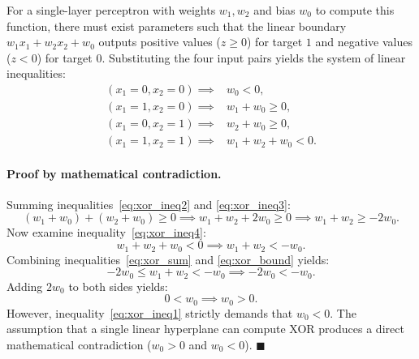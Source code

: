 \documentclass[../../main.tex]{subfiles}
\begin{document}
For a single-layer perceptron with weights $w_1, w_2$ and bias $w_0$ to compute this function, there must exist parameters such that the linear boundary $w_1 x_1 + w_2 x_2 + w_0$ outputs positive values ($z \ge 0$) for target $1$ and negative values ($z < 0$) for target $0$. Substituting the four input pairs yields the system of linear inequalities:
\begin{align}
(x_1 = 0, x_2 = 0) \implies &w_0 < 0, \label{eq:xor_ineq1} \\
(x_1 = 1, x_2 = 0) \implies &w_1 + w_0 \ge 0, \label{eq:xor_ineq2} \\
(x_1 = 0, x_2 = 1) \implies &w_2 + w_0 \ge 0, \label{eq:xor_ineq3} \\
(x_1 = 1, x_2 = 1) \implies &w_1 + w_2 + w_0 < 0. \label{eq:xor_ineq4}
\end{align}

\paragraph{Proof by mathematical contradiction.}
Summing inequalities~\eqref{eq:xor_ineq2} and \eqref{eq:xor_ineq3}:
\begin{equation}
\label{eq:xor_sum}
(w_1 + w_0) + (w_2 + w_0) \ge 0 \implies w_1 + w_2 + 2w_0 \ge 0 \implies w_1 + w_2 \ge -2w_0.
\end{equation}
Now examine inequality~\eqref{eq:xor_ineq4}:
\begin{equation}
\label{eq:xor_bound}
w_1 + w_2 + w_0 < 0 \implies w_1 + w_2 < -w_0.
\end{equation}
Combining inequalities~\eqref{eq:xor_sum} and \eqref{eq:xor_bound} yields:
\[
-2w_0 \le w_1 + w_2 < -w_0 \implies -2w_0 < -w_0.
\]
Adding $2w_0$ to both sides yields:
\[
0 < w_0 \implies w_0 > 0.
\]
However, inequality~\eqref{eq:xor_ineq1} strictly demands that $w_0 < 0$. The assumption that a single linear hyperplane can compute XOR produces a direct mathematical contradiction ($w_0 > 0$ and $w_0 < 0$). \hfill $\blacksquare$
\end{document}
